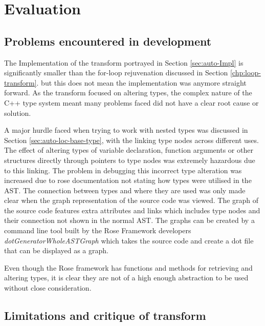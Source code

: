 \documentclass[bsc,frontabs,singlespacing,twoside,parskip,deptreport]{infthesis}
\begin{document}
\section{Evaluation} %

\subsection{Problems encountered in development}

The Implementation of the transform portrayed in Section \ref{sec:auto-Impl} is significantly smaller than the for-loop rejuvenation discussed in Section \ref{chp:loop-transform}. but this does not mean the implementation was anymore straight forward. As the transform focused on altering types, the complex nature of the C++ type system meant many problems faced did not have a clear root cause or solution. 

A major hurdle faced when trying to work with nested types was discussed in Section \ref{sec:auto-loc-base-type}, with the linking type nodes across different uses. The effect of altering types of variable declaration, function arguments or other structures directly through pointers to type nodes was extremely hazardous due to this linking. The problem in debugging this incorrect type alteration was increased due to rose documentation not stating how types were utilised in the AST. The connection between types and where they are used was only made clear when the graph representation of the source code was viewed. The graph of the source code features extra attributes and links which includes type nodes and their connection not shown in the normal AST. The graphs can be created by a command line tool built by the Rose Framework developers \textit{dotGeneratorWholeASTGraph} \cite{ROSE_TUT} which takes the source code and create a dot file that can be displayed as a graph.

Even though the Rose framework has functions and methods for retrieving and altering types, it is clear they are not of a high enough abstraction to be used without close consideration.

\subsection{Limitations and critique of transform} 

\end{document}
